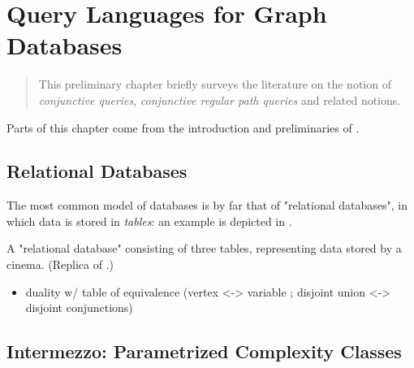 \chapter{Query Languages for Graph Databases}
\label{ch:prelim-graph-databases}

\begin{chapterpresentation}
	\begin{abstract}
		This preliminary chapter briefly surveys the literature on
		the notion of \emph{conjunctive queries},
		\emph{conjunctive regular path queries} and related notions.

	\end{abstract}
	\par\bigskip\bigskip
	\begin{acknowledgements}
		Parts of this chapter come from the introduction and preliminaries of \cite{FigueiraMorvan2025SemanticTreeWidthLMCS,FigueiraMorvanRomero2025Minimizing}.
	\end{acknowledgements}
	\clearpagepresentation
	\chaptertocstandalone
\end{chapterpresentation}

\section{Relational Databases}

The most common model of databases is by far that of "relational databases",
in which data is stored in \emph{tables}: an example is depicted
in .

\begin{table}
	\centering%
	
	\caption{
		\AP\label{fig:relational-database-cinema}
		A "relational database" consisting of three tables, representing data
		stored by a cinema. (Replica of .)
	}
\end{table}


\begin{itemize}
	\item duality w/ table of equivalence (vertex <-> variable ; disjoint union <-> disjoint conjunctions)
\end{itemize}

\section{Intermezzo: Parametrized Complexity Classes}


